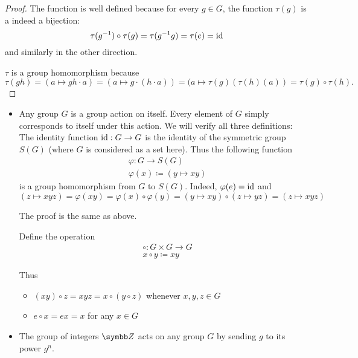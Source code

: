 \begin{proof}
  The function is well defined because for every \( g \in G \), the function \( \tau(g) \) is a indeed a bijection:
  \begin{equation*}
    \tau(g^{-1}) \circ \tau(g)
    =
    \tau(g^{-1} g)
    =
    \tau(e)
    =
    \operatorname{id}
  \end{equation*}
  and similarly in the other direction.

  \( \tau \) is a group homomorphism because
  \begin{equation*}
    \tau(g h)
    =
    (a \mapsto gh \cdot a)
    =
    (a \mapsto g \cdot (h \cdot a))
    =
    (a \mapsto \tau(g)(\tau(h)(a))
    =
    \tau(g) \circ \tau(h).
  \end{equation*}
\end{proof}

\begin{example}\label{ex:group_actions}
  \begin{itemize}\mbox{}
    \item Any group \( G \) is a group action on itself. Every element of \( G \) simply corresponds to itself under this action. We will verify all three definitions:
           The identity function \( \operatorname{id}: G \to G \) is the identity of the symmetric group \( S(G) \) (where \( G \) is considered as a set here). Thus the following function
          \begin{align*}
             & \varphi: G \to S(G)                 \\
             & \varphi(x) \coloneqq (y \mapsto xy)
          \end{align*}
          is a group homomorphism from \( G \) to \( S(G) \). Indeed, \( \varphi(e) = \operatorname{id} \) and
          \begin{equation*}
            (z \mapsto xyz) = \varphi(xy) = \varphi(x) \circ \varphi(y) = (y \mapsto xy) \circ (z \mapsto yz) = (z \mapsto xyz)
          \end{equation*}

           The proof is the same as above.

           Define the operation
          \begin{align*}
             & \circ: G \times G \to G \\
             & x \circ y \coloneqq xy
          \end{align*}

          Thus
          \begin{itemize}
            \item \( (x y) \circ z = xyz = x \circ (y \circ z) \) whenever \( x, y, z \in G \)
            \item \( e \circ x = ex = x \) for any \( x \in G \)
          \end{itemize}

    \item The group of integers \( \BZ \) acts on any group \( G \) by sending \( g \) to its power \( g^n \).
  \end{itemize}
\end{example}

